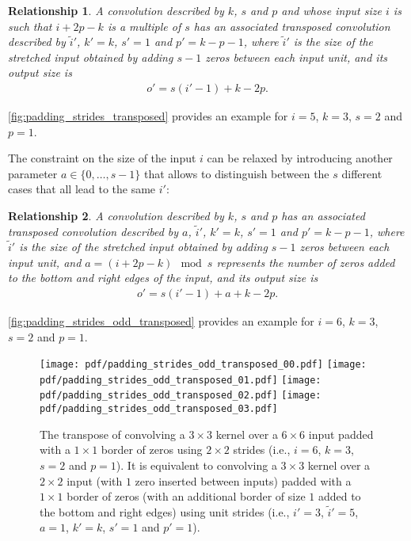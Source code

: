 \documentclass[notitlepage]{report}
\newtheorem{relationship}{Relationship}
\begin{document}
\begin{relationship}\label{rel:padding_strides_transposed}
A convolution described by $k$, $s$ and $p$ and whose
input size $i$ is such that $i + 2p - k$ is a multiple of $s$ has an associated
transposed convolution described by $\tilde{i}'$, $k' = k$, $s' = 1$ and
$p' = k - p - 1$, where $\tilde{i}'$ is the size of the stretched input
obtained by adding $s - 1$ zeros between each input unit, and its output size
is
\begin{equation*}
\begin{split}
    o' = s (i' - 1) + k - 2p.
\end{split}
\end{equation*}
\end{relationship}

\autoref{fig:padding_strides_transposed} provides an example for $i = 5$, $k =
3$, $s = 2$ and $p = 1$.

The constraint on the size of the input $i$ can be relaxed by introducing
another parameter $a \in \{0, \ldots, s - 1\}$ that allows to distinguish
between the $s$ different cases that all lead to the same $i'$:

\begin{relationship}\label{rel:padding_strides_transposed_odd}
A convolution described by $k$, $s$ and $p$ has an
associated transposed convolution described by $a$, $\tilde{i}'$, $k' = k$, $s'
= 1$ and $p' = k - p - 1$, where $\tilde{i}'$ is the size of the stretched
input obtained by adding $s - 1$ zeros between each input unit, and $a = (i +
2p - k) \mod s$ represents the number of zeros added to the bottom and right edges
of the input, and its output size is
\begin{equation*}
\begin{split}
    o' = s (i' - 1) + a + k - 2p.
\end{split}
\end{equation*}
\end{relationship}

\autoref{fig:padding_strides_odd_transposed} provides an example for $i = 6$, $k
= 3$, $s = 2$ and $p = 1$.

\begin{figure}[p]
    \centering
    \texttt{[image: pdf/padding\_strides\_odd\_transposed\_00.pdf]}
    \texttt{[image: pdf/padding\_strides\_odd\_transposed\_01.pdf]}
    \texttt{[image: pdf/padding\_strides\_odd\_transposed\_02.pdf]}
    \texttt{[image: pdf/padding\_strides\_odd\_transposed\_03.pdf]}
    \caption{\label{fig:padding_strides_odd_transposed} The transpose of
        convolving a $3 \times 3$ kernel over a $6 \times 6$ input padded with a
        $1 \times 1$ border of zeros using $2 \times 2$ strides (i.e., $i = 6$,
        $k = 3$, $s = 2$ and $p = 1$). It is equivalent to convolving a $3
        \times 3$ kernel over a $2 \times 2$ input (with $1$ zero inserted
        between inputs) padded with a $1 \times 1$ border of zeros (with an
        additional border of size $1$ added to the bottom and right edges) using
        unit strides (i.e., $i' = 3$, $\tilde{i}' = 5$, $a = 1$, $k' = k$, $s' =
        1$ and $p' = 1$).}
\end{figure}
\end{document}

